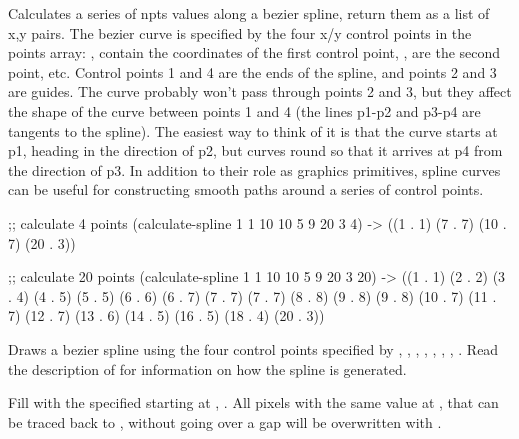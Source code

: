 Calculates a series of npts values along a bezier spline, return them as a list of x,y pairs. The bezier curve is specified by the four x/y control points in the points array: ,  contain the coordinates of the first control point, ,  are the second point, etc. Control points 1 and 4 are the ends of the spline, and points 2 and 3 are guides. The curve probably won't pass through points 2 and 3, but they affect the shape of the curve between points 1 and 4 (the lines p1-p2 and p3-p4 are tangents to the spline). The easiest way to think of it is that the curve starts at p1, heading in the direction of p2, but curves round so that it arrives at p4 from the direction of p3.  In addition to their role as graphics primitives, spline curves can be useful for constructing smooth paths around a series of control points.

\begin{schemedisplay}
;; calculate 4 points
(calculate-spline 1 1 10 10 5 9 20 3 4)
-> ((1 . 1) (7 . 7) (10 . 7) (20 . 3))

;; calculate 20 points
(calculate-spline 1 1 10 10 5 9 20 3 20)
-> ((1 . 1) (2 . 2) (3 . 4) (4 . 5) (5 . 5) (6 . 6) (6 . 7)
(7 . 7) (7 . 7) (8 . 8) (9 . 8) (9 . 8) (10 . 7) (11 . 7)
(12 . 7) (13 . 6) (14 . 5) (16 . 5) (18 . 4) (20 . 3))
\end{schemedisplay}


Draws a bezier spline using the four control points specified by , , , , , , , . Read the description of  for information on how the spline is generated.








Fill  with the specified  starting at , . All pixels with the same value at ,  that can be traced back to ,  without going over a gap will be overwritten with .

